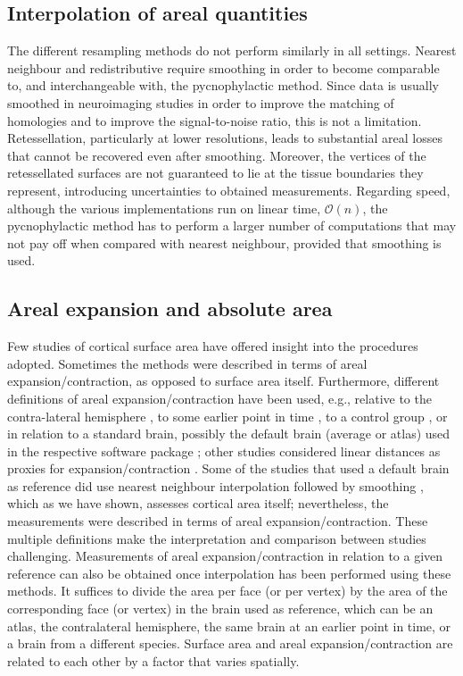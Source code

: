 \subsection{Interpolation of areal quantities}

The different resampling methods do not perform similarly in all settings. Nearest neighbour and redistributive require smoothing in order to become comparable to, and interchangeable with, the pycnophylactic method. Since data is usually smoothed in neuroimaging studies in order to improve the matching of homologies and to improve the signal-to-noise ratio, this is not a limitation. Retessellation, particularly at lower resolutions, leads to substantial areal losses that cannot be recovered even after smoothing. Moreover, the vertices of the retessellated surfaces are not guaranteed to lie at the tissue boundaries they represent, introducing uncertainties to obtained measurements. Regarding speed, although the various implementations run on linear time, $\mathcal{O}(n)$, the pycnophylactic method has to perform a larger number of computations that may not pay off when compared with nearest neighbour, provided that smoothing is used.

\subsection{Areal expansion and absolute area}

Few studies of cortical surface area have offered insight into the procedures adopted. Sometimes the methods were described in terms of areal expansion/contraction, as opposed to surface area itself. Furthermore, different definitions of areal expansion/contraction have been used, e.g., relative to the contra-lateral hemisphere \citep{Lyttelton2009}, to some earlier point in time \citep{Hill2010}, to a control group \citep{Palaniyappan2011}, or in relation to a standard brain, possibly the default brain (average or atlas) used in the respective software package \citep{Joyner2009, Rimol2010_pnas, Rimol2012, Chen2011, Chen2012, Vuoksimaa2016}; other studies considered linear distances as proxies for expansion/contraction \citep{Sun2009_sr, Sun2009_mp}. Some of the studies that used a default brain as reference did use nearest neighbour interpolation followed by smoothing \citep{Joyner2009, Rimol2010_pnas, Rimol2012}, which as we have shown, assesses cortical area itself; nevertheless, the measurements were described in terms of areal expansion/contraction. These multiple definitions make the interpretation and comparison between studies challenging. Measurements of areal expansion/contraction in relation to a given reference can also be obtained once interpolation has been performed using these methods. It suffices to divide the area per face (or per vertex) by the area of the corresponding face (or vertex) in the brain used as reference, which can be an atlas, the contralateral hemisphere, the same brain at an earlier point in time, or a brain from a different species. Surface area and areal expansion/contraction are related to each other by a factor that varies spatially.

